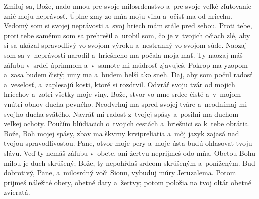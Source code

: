 Zmiluj sa, Bože, nado mnou pre svoje milosrdenstvo
a~pre svoje veľké zľutovanie znič moju neprávosť.
Úplne zmy zo mňa moju vinu
a~očisť ma od hriechu.
\versseparator
Vedomý som si svojej neprávosti
a~svoj hriech mám stále pred sebou.
\versseparator
Proti tebe, proti tebe samému som sa prehrešil
a~urobil som, čo je v~tvojich očiach zlé,
aby si sa ukázal spravodlivý vo svojom výroku
a~nestranný vo svojom súde.
\versseparator
Naozaj som sa v~neprávosti narodil
a~hriešneho ma počala moja mať.
Ty naozaj máš záľubu v~srdci úprimnom
a~v~samote mi múdrosť zjavuješ.
\versseparator
Pokrop ma yzopom a~zasa budem čistý;
umy ma a~budem belší ako sneh.
Daj, aby som počul radosť a~veselosť,
a~zaplesajú kosti, ktoré si rozdrvil.
\versseparator
Odvráť svoju tvár od mojich hriechov
a~zotri všetky moje viny.
Bože, stvor vo mne srdce čisté
a~v~mojom vnútri obnov ducha pevného.
\versseparator
Neodvrhuj ma spred svojej tváre
a~neodnímaj mi svojho ducha svätého.
Navráť mi radosť z~tvojej spásy
a~posilni ma duchom veľkej ochoty.
\versseparator
Poučím blúdiacich o~tvojich cestách
a~hriešnici sa k~tebe obrátia.
Bože, Boh mojej spásy, zbav ma škvrny krvipreliatia
a~môj jazyk zajasá nad tvojou spravodlivosťou.
\versseparator
Pane, otvor moje pery
a~moje ústa budú ohlasovať tvoju slávu.
Veď ty nemáš záľubu v~obete,
ani žertvu neprijmeš odo mňa.
Obetou Bohu milou je duch skrúšený;
Bože, ty nepohŕdaš srdcom skrúšeným a~poníženým.
\versseparator
Buď dobrotivý, Pane, a~milosrdný voči Sionu,
vybuduj múry Jeruzalema.
Potom prijmeš náležité obety, obetné dary a~žertvy;
potom položia na tvoj oltár obetné zvieratá. 
